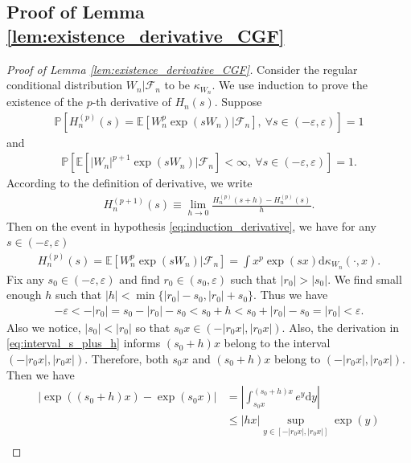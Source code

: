 \documentclass[12pt]{article}
\theoremstyle{definition}
\def\P{\mathbb{P}}
\def\P{\mathbb{P}}
\newcommand{\E}{\mathbb E}								%
\renewcommand{\P}{\mathbb{P}}							%
\begin{document}
\subsection{Proof of Lemma \ref{lem:existence_derivative_CGF}}

\begin{proof}[Proof of Lemma \ref{lem:existence_derivative_CGF}]
	Consider the regular conditional distribution $W_n|\mathcal{F}_n$ to be $\kappa_{W_n}$. We use induction to prove the existence of the $p$-th derivative of $H_n(s)$. Suppose 
	\begin{align}\label{eq:induction_derivative}
		\P\left[H_n^{(p)}(s)=\E[W_n^p\exp(sW_n)|\mathcal{F}_n],\ \forall s\in (-\varepsilon,\varepsilon)\right]=1
	\end{align} 
	and 
	\begin{align}\label{eq:induction_assumption}
		\P\left[\E[|W_n|^{p+1}\exp(sW_n)|\mathcal{F}_n]<\infty,\ \forall s\in(-\varepsilon,\varepsilon)\right]=1.
	\end{align}
	According to the definition of derivative, we write 
	\begin{align}\label{eq:derivative_definition}
		H_n^{(p+1)}(s)\equiv \lim_{h\rightarrow0}\frac{H_n^{(p)}(s+h)-H_n^{(p)}(s)}{h}.
	\end{align} 
	Then on the event in hypothesis \eqref{eq:induction_derivative}, we have for any $s\in (-\varepsilon,\varepsilon)$
	\begin{align*}
		H_n^{(p)}(s)=\E[W_n^p\exp(sW_n)|\mathcal{F}_n]=\int x^p\exp(sx)\mathrm{d}\kappa_{W_n}(\cdot,x).
	\end{align*}
	Fix any $s_0\in (-\varepsilon,\varepsilon)$ and find $r_0\in (s_0,\varepsilon)$ such that $|r_0|>|s_0|$. We find small enough $h$ such that $|h|<\min\{|r_0|-s_0,|r_0|+s_0\}$. Thus we have
	\begin{align}\label{eq:interval_s_plus_h}
		-\varepsilon <-|r_0|=s_0-|r_0|-s_0<s_0+h< s_0+|r_0|-s_0 = |r_0|<\varepsilon.
	\end{align} 
	Also we notice, $|s_0|<|r_0|$ so that $s_0x\in (-|r_0x|,|r_0x|)$. Also, the derivation in \eqref{eq:interval_s_plus_h} informs $(s_0+h)x$ belong to the interval $(-|r_0x|,|r_0x|)$. Therefore, both $s_0x$ and $(s_0+h)x$ belong to $(-|r_0x|,|r_0x|)$. Then we have
	\begin{align}
		|\exp((s_0+h)x)-\exp(s_0x)|
		&\nonumber
		=\left|\int_{s_0x}^{(s_0+h)x}e^{y}\mathrm{d}y\right|\\
		&\nonumber
		\leq |hx|\sup_{y\in [-|r_0x|,|r_0x|]}\exp(y)\\

\end{align}
\end{proof}
\end{document}
